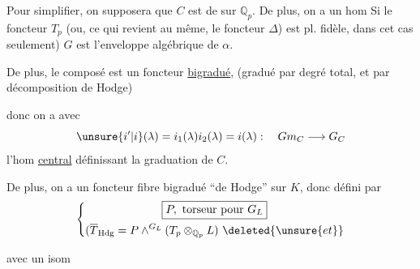 Pour simplifier, on supposera que $C$ est de  sur $\mathbb Q_p$. De plus, on a un hom
Si le foncteur \deleted{\unsure{$\Phi$}} $T_p$ (ou, ce qui revient au même,  le foncteur $\Delta$) est pl. fidèle, dans cet cas seulement) $G$ est l'enveloppe algébrique de $\alpha$.

De plus, le composé
est un foncteur \uline{bigradué},  (gradué par degré total, et par décomposition de Hodge)

donc on a
avec
\[
\unsure{i'|i}(\lambda)=i_1(\lambda)i_2(\lambda)=i(\lambda):\quad Gm_C\longrightarrow G_C
\]
l'hom \uline{central} définissant la graduation de $C$.

De plus, on a un  foncteur fibre  bigradué ``de Hodge'' sur $K$, donc défini par
\[
\left\{\begin{gathered}
\boxed{P,\ \text{torseur pour }G_L}\\
(\overline T_{\mathrm{Hdg}}=P\mathbin{\wedge}^{G_L}(T_p\otimes_{\mathbb Q_p}L)\ \deleted{\unsure{et}}
\end{gathered}\right.
\]
\diagram{\[
\left\{\begin{gathered}
\begin{tikzcd}
Gm_L\arrow[r,shift left=.6ex,"j_1"]\arrow[r,shift right=.6ex,"j_2"']&\deleted{\unsure{G'}}G_L^P=\operatorname{ad}(P)
\end{tikzcd}\\
j_1(\lambda)j_2(\lambda)=i(\lambda)
\end{gathered}\right.
\]}

avec un isom

